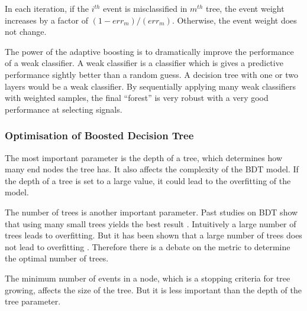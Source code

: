 In each iteration, if the $i^{th}$ event is misclassified in $m^{th}$ tree, the event weight increases by a factor of $(1 - err_m)/(err_m)$. Otherwise, the event weight does not change.

The power of the adaptive boosting  is to dramatically improve the performance of a weak classifier. A weak classifier is a classifier which is gives a predictive performance sightly better than a random guess. A decision tree with one or two layers would be a weak classifier. By sequentially applying many weak classifiers with weighted samples, the final ``forest'' is very robust with a very good performance at selecting signals.



\subsubsection{Optimisation of Boosted Decision Tree}
\label{sec:pandoraMVAbdtVar}


The most important parameter is the depth of a tree, which determines how many end nodes the tree has. It also affects the complexity of the BDT model. If the depth of a tree is set to a large value, it could lead to the overfitting of the model.

The number of trees is another important parameter. Past studies on BDT show that using many small trees yields the best result \cite{hastie2009elements}. Intuitively a large number of trees leads to overfitting. But it has been shown that a large number of trees  does not lead to overfitting \cite{hastie2009elements}. Therefore there is a debate on the metric to determine the optimal number of trees.

The minimum number of events in a node, which is a stopping criteria for tree growing, affects the size of the tree. But it is less important than the depth of the tree parameter.

